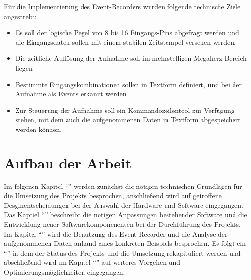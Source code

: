 Für die Implementierung des Event-Recorders wurden folgende technische Ziele angestrebt:
\begin{itemize}
\item Es soll der logische Pegel von 8 bis 16 Eingangs-Pins abgefragt werden und die Eingangsdaten sollen mit einem stabilen Zeitstempel versehen werden.
\item Die zeitliche Auflösung der Aufnahme soll im mehrstelligen Megaherz-Bereich liegen
\item Bestimmte Eingangskombinationen sollen in Textform definiert, und bei der Aufnahme als Events erkannt werden
\item Zur Steuerung der Aufnahme soll ein Kommandozeilentool zur Verfügung stehen, mit dem auch die aufgenommenen Daten in Textform abgespeichert werden können.
\end{itemize} 

\section{Aufbau der Arbeit}
\label{ch:Einfuehrung:Aufbau}

Im folgenen Kapitel ``'' werden zunächst die nötigen technischen Grundlagen für die Umsetzung des Projekts besprochen, anschließend wird auf getroffene Desginentscheidungen bei der Auswahl der Hardware und Software eingegangen.%
 Das Kaptiel ``'' beschreibt die nötigen Anpassungen bestehender Software und die Entwicklung neuer Softwarekomponenenten bei der Durchführung des Projekts.
Im Kapitel ``'' wird die Benutzung des Event-Recorder und die Analyse der aufgenommenen Daten anhand eines konkreten Beispiels besprochen.
Es folgt ein ``'' in dem der Status des Projekts und die Umsetzung rekapituliert werden und abschließend wird im Kapitel ``'' auf weiteres Vorgehen und Optimierungsmöglichkeiten eingegangen.




